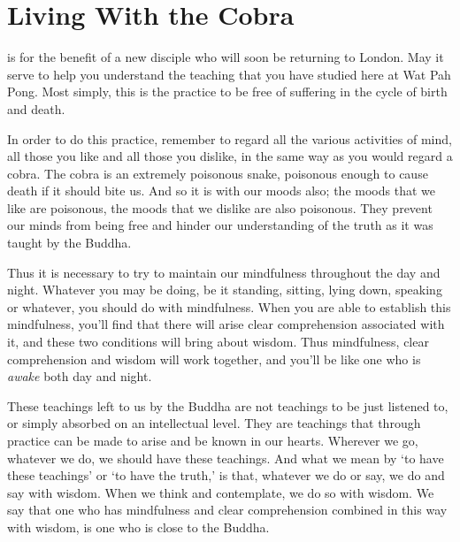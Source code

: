 
\chapter{Living With the Cobra}

\vspace*{0.5\baselineskip}
 is for the benefit of a new disciple who will soon be returning to London. May it serve to help you understand the teaching that you have studied here at Wat Pah Pong. Most simply, this is the practice to be free of suffering in the cycle of birth and death. 

In order to do this practice, remember to regard all the various activities of mind, all those you like and all those you dislike, in the same way as you would regard a cobra. The cobra is an extremely poisonous snake, poisonous enough to cause death if it should bite us. And so it is with our moods also; the moods that we like are poisonous, the moods that we dislike are also poisonous. They prevent our minds from being free and hinder our understanding of the truth as it was taught by the Buddha. 

Thus it is necessary to try to maintain our mindfulness throughout the day and night. Whatever you may be doing, be it standing, sitting, lying down, speaking or whatever, you should do with mindfulness. When you are able to establish this mindfulness, you'll find that there will arise clear comprehension associated with it, and these two conditions will bring about wisdom. Thus mindfulness, clear comprehension and wisdom will work together, and you'll be like one who is \textit{awake} both day and night. 

These teachings left to us by the Buddha are not teachings to be just listened to, or simply absorbed on an intellectual level. They are teachings that through practice can be made to arise and be known in our hearts. Wherever we go, whatever we do, we should have these teachings. And what we mean by `to have these teachings' or `to have the truth,' is that, whatever we do or say, we do and say with wisdom. When we think and contemplate, we do so with wisdom. We say that one who has mindfulness and clear comprehension combined in this way with wisdom, is one who is close to the Buddha. 

